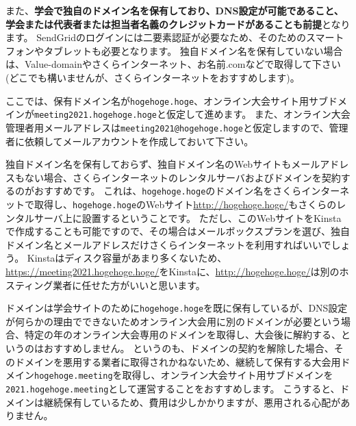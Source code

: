 \documentclass[titlepage,10pt,a4paper,uplatex]{jsbook}
\renewcommand{\textbf}[1]{{\bfseries\sffamily#1}}
\begin{document}
また、\textbf{学会で独自のドメイン名を保有しており、DNS設定が可能であること、学会または代表者または担当者名義のクレジットカードがあることも前提}となります。
SendGridのログインには二要素認証が必要なため、そのためのスマートフォンやタブレットも必要となります。
独自ドメイン名を保有していない場合は、Value-domainやさくらインターネット、お名前.comなどで取得して下さい(どこでも構いませんが、さくらインターネットをおすすめします)。

ここでは、保有ドメイン名が\texttt{hogehoge.hoge}、オンライン大会サイト用サブドメインが\texttt{meeting2021.hogehoge.hoge}と仮定して進めます。
また、オンライン大会管理者用メールアドレスは\texttt{meeting2021@hogehoge.hoge}と仮定しますので、管理者に依頼してメールアカウントを作成しておいて下さい。

独自ドメイン名を保有しておらず、独自ドメイン名のWebサイトもメールアドレスもない場合、さくらインターネットのレンタルサーバおよびドメインを契約するのがおすすめです。
これは、\texttt{hogehoge.hoge}のドメイン名をさくらインターネットで取得し、\texttt{hogehoge.hoge}のWebサイト\url{http://hogehoge.hoge/}もさくらのレンタルサーバ上に設置するということです。
ただし、このWebサイトをKinstaで作成することも可能ですので、その場合はメールボックスプランを選び、独自ドメイン名とメールアドレスだけさくらインターネットを利用すればいいでしょう。
Kinstaはディスク容量があまり多くないため、\url{https://meeting2021.hogehoge.hoge/}をKinstaに、\url{http://hogehoge.hoge/}は別のホスティング業者に任せた方がいいと思います。

ドメインは学会サイトのために\texttt{hogehoge.hoge}を既に保有しているが、DNS設定が何らかの理由でできないためオンライン大会用に別のドメインが必要という場合、特定の年のオンライン大会専用のドメインを取得し、大会後に解約する、というのはおすすめしません。
というのも、ドメインの契約を解除した場合、そのドメインを悪用する業者に取得されかねないため、継続して保有する大会用ドメイン\texttt{hogehoge.meeting}を取得し、オンライン大会サイト用サブドメインを\texttt{2021.hogehoge.meeting}として運営することをおすすめします。
こうすると、ドメインは継続保有しているため、費用は少しかかりますが、悪用される心配がありません。
\end{document}
